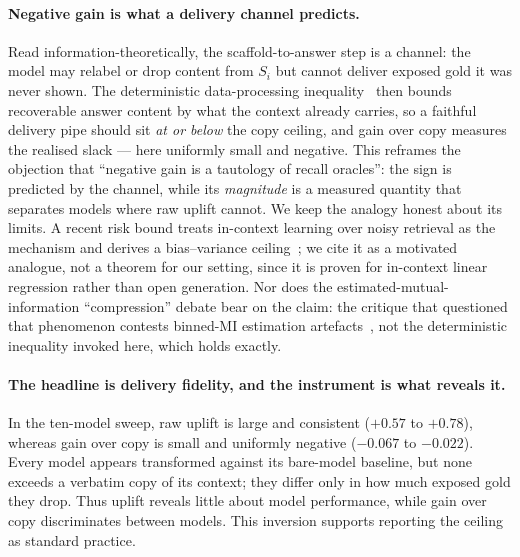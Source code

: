 \documentclass[10pt,twocolumn]{article}
\begin{document}
\paragraph{Negative gain is what a delivery channel predicts.} Read information-theoretically, the scaffold-to-answer step is a channel: the model may relabel or drop content from $S_i$ but cannot deliver exposed gold it was never shown. The deterministic data-processing inequality~\cite{coverthomas2006} then bounds recoverable answer content by what the context already carries, so a faithful delivery pipe should sit \emph{at or below} the copy ceiling, and gain over copy measures the realised slack --- here uniformly small and negative. This reframes the objection that ``negative gain is a tautology of recall oracles'': the sign is predicted by the channel, while its \emph{magnitude} is a measured quantity that separates models where raw uplift cannot. We keep the analogy honest about its limits. A recent risk bound treats in-context learning over noisy retrieval as the mechanism and derives a bias--variance ceiling~\cite{guo2025noisyicl}; we cite it as a motivated analogue, not a theorem for our setting, since it is proven for in-context linear regression rather than open generation. Nor does the estimated-mutual-information ``compression'' debate bear on the claim: the critique that questioned that phenomenon contests binned-MI estimation artefacts~\cite{saxe2018ib}, not the deterministic inequality invoked here, which holds exactly.

\paragraph{The headline is delivery fidelity, and the instrument is what reveals it.} In the ten-model sweep, raw uplift is large and consistent ($+0.57$ to $+0.78$), whereas gain over copy is small and uniformly negative ($-0.067$ to $-0.022$). Every model appears transformed against its bare-model baseline, but none exceeds a verbatim copy of its context; they differ only in how much exposed gold they drop. Thus uplift reveals little about model performance, while gain over copy discriminates between models. This inversion supports reporting the ceiling as standard practice.
\end{document}
